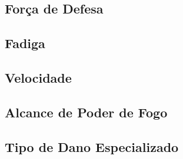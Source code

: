 \subsection{Força de Defesa}

\subsection{Fadiga}

\subsection{Velocidade}

\subsection{Alcance de Poder de Fogo}

\subsection{Tipo de Dano Especializado}
